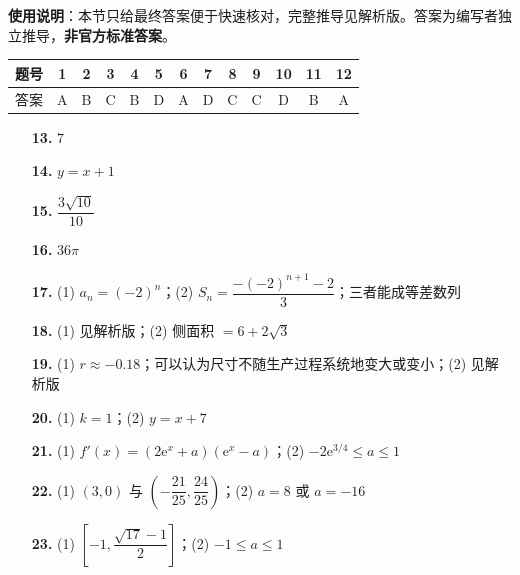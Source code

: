 
\begin{gknotice}
\textbf{使用说明}：本节只给最终答案便于快速核对，完整推导见解析版。答案为编写者独立推导，\textbf{非官方标准答案}。
\end{gknotice}

\begin{center}\begin{tabular}{ccccccccccccc}
\toprule
题号 & 1 & 2 & 3 & 4 & 5 & 6 & 7 & 8 & 9 & 10 & 11 & 12 \\
\midrule
答案 & A & B & C & B & D & A & D & C & C & D & B & A \\
\bottomrule
\end{tabular}\end{center}

\begin{itemize}[leftmargin=2.6em]
  \item[\textbf{13.}] $7$
  \item[\textbf{14.}] $y=x+1$
  \item[\textbf{15.}] $\dfrac{3\sqrt{10}}{10}$
  \item[\textbf{16.}] $36\pi$
\end{itemize}

\begin{itemize}[leftmargin=2.6em]
  \item[\textbf{17.}] (1) $a_n=(-2)^{n}$；(2) $S_n=\dfrac{-(-2)^{n+1}-2}3$；三者能成等差数列
  \item[\textbf{18.}] (1) 见解析版；(2) 侧面积 $=6+2\sqrt3$
  \item[\textbf{19.}] (1) $r\approx-0.18$；可以认为尺寸不随生产过程系统地变大或变小；(2) 见解析版
  \item[\textbf{20.}] (1) $k=1$；(2) $y=x+7$
  \item[\textbf{21.}] (1) $f'(x)=\left(2\mathrm e^{x}+a\right)\left(\mathrm e^{x}-a\right)$；(2) $-2\mathrm e^{3/4}\le a\le1$
\end{itemize}

\begin{itemize}[leftmargin=2.6em]
  \item[\textbf{22.}] (1) $(3,0)$ 与 $\left(-\dfrac{21}{25},\dfrac{24}{25}\right)$；(2) $a=8$ 或 $a=-16$
  \item[\textbf{23.}] (1) $\left[-1,\dfrac{\sqrt{17}-1}2\right]$；(2) $-1\le a\le1$
\end{itemize}
